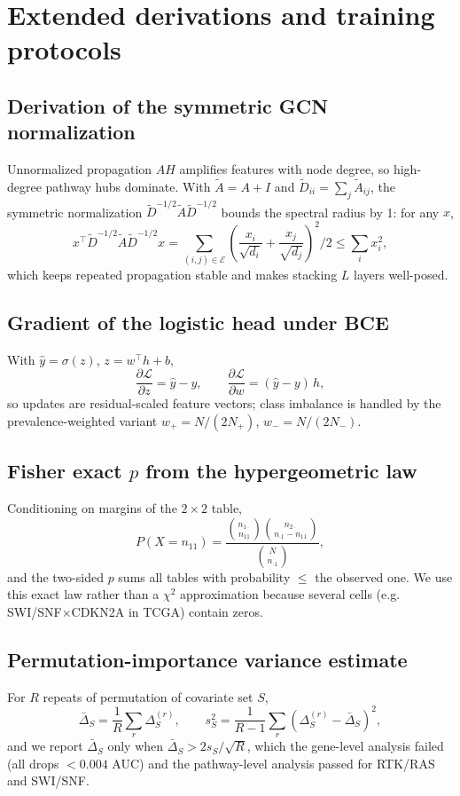 \section{Extended derivations and training protocols}
\subsection{Derivation of the symmetric GCN normalization}
Unnormalized propagation $AH$ amplifies features with node degree, so high-degree pathway hubs dominate. With $\tilde A=A+I$ and $\tilde D_{ii}=\sum_j\tilde A_{ij}$, the symmetric normalization $\tilde D^{-1/2}\tilde A\tilde D^{-1/2}$ bounds the spectral radius by 1: for any $x$,
\begin{equation}
x^{\top}\tilde D^{-1/2}\tilde A\tilde D^{-1/2}x
=\sum_{(i,j)\in\mathcal E}\left(\frac{x_i}{\sqrt{d_i}}+\frac{x_j}{\sqrt{d_j}}\right)^{\!2}\Big/2
\le \sum_i x_i^2,
\end{equation}
which keeps repeated propagation stable and makes stacking $L$ layers well-posed.
\subsection{Gradient of the logistic head under BCE}
With $\hat y=\sigma(z)$, $z=w^{\top}h+b$,
\begin{equation}
\frac{\partial\mathcal L}{\partial z}
=\hat y-y,\qquad
\frac{\partial\mathcal L}{\partial w}=(\hat y-y)\,h,
\end{equation}
so updates are residual-scaled feature vectors; class imbalance is handled by the prevalence-weighted variant $w_+=N/(2N_+)$, $w_-=N/(2N_-)$.
\subsection{Fisher exact $p$ from the hypergeometric law}
Conditioning on margins of the $2\times2$ table,
\begin{equation}
P(X=n_{11})=\frac{\binom{n_{1\cdot}}{n_{11}}\binom{n_{2\cdot}}{n_{\cdot1}-n_{11}}}{\binom{N}{n_{\cdot1}}},
\end{equation}
and the two-sided $p$ sums all tables with probability $\le$ the observed one. We use this exact law rather than a $\chi^2$ approximation because several cells (e.g. SWI/SNF$\times$CDKN2A in TCGA) contain zeros.
\subsection{Permutation-importance variance estimate}
For $R$ repeats of permutation of covariate set $S$,
\begin{equation}
\bar\Delta_S=\frac1R\sum_{r}\Delta_S^{(r)},\qquad
s_S^2=\frac{1}{R-1}\sum_r(\Delta_S^{(r)}-\bar\Delta_S)^2,
\end{equation}
and we report $\bar\Delta_S$ only when $\bar\Delta_S > 2 s_S/\sqrt{R}$, which the gene-level analysis failed (all drops $<0.004$ AUC) and the pathway-level analysis passed for RTK/RAS and SWI/SNF.

